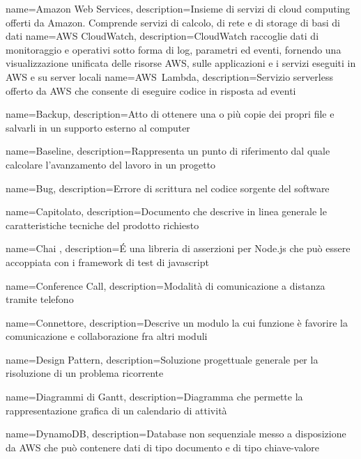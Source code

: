 {
	name={Amazon Web Services},
	description={Insieme di servizi di cloud computing offerti da Amazon. Comprende servizi di calcolo, di rete e di storage di basi di dati}
}
{
	name={AWS CloudWatch},
	description={CloudWatch raccoglie dati di monitoraggio e operativi sotto forma di log, parametri ed eventi, fornendo una visualizzazione unificata delle risorse AWS, sulle applicazioni e i servizi eseguiti in AWS e su server locali}
}
{
	name={AWS~Lambda},
	description={Servizio serverless offerto da AWS che consente di eseguire codice in risposta ad eventi}
	{\pagebreak}
}

{
	name={Backup},
	description={Atto di ottenere una o più copie dei propri file e salvarli in un supporto esterno al computer}
}

{
	name={Baseline},
	description={Rappresenta un punto di riferimento dal quale calcolare l’avanzamento del lavoro in un progetto}
}

{
	name={Bug},
	description={Errore di scrittura nel codice sorgente del software}
	{\pagebreak}
}

{
	name={Capitolato},
	description={Documento che descrive in linea generale le caratteristiche tecniche del prodotto richiesto}
}

{
	name={Chai },
	description={É una libreria di asserzioni per Node.js che può essere accoppiata con i framework di test di javascript}
}

{
	name={Conference Call},
	description={Modalità di comunicazione a distanza tramite telefono}
}

{
	name={Connettore},
	description={Descrive un modulo la cui funzione è favorire la comunicazione e collaborazione fra altri moduli}
	{\pagebreak}
}

{
	name={Design Pattern},
	description={Soluzione progettuale generale per la risoluzione di un problema ricorrente}
}

{
	name={Diagrammi di Gantt},
	description={Diagramma che permette la rappresentazione grafica di un calendario di attività}
}

{
	name={DynamoDB},
	description={Database non sequenziale messo a disposizione da AWS che può contenere dati di tipo documento e di tipo chiave-valore}
	{\pagebreak}
}

